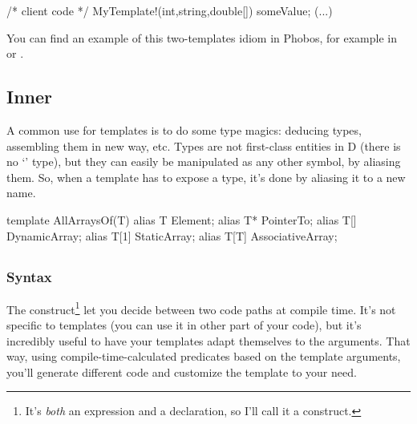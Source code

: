 \begin{dcode}
/* client code */
MyTemplate!(int,string,double[]) someValue;
(...)
\end{dcode}

You can find an example of this two-templates idiom in Phobos, for example in  or .

\subsection{Inner }\label{inneralias}

A common use for templates is to do some type magics: deducing types, assembling them in new way, etc. Types are not first-class entities in D (there is no `' type), but they can easily be manipulated as any other symbol, by aliasing them. So, when a template has to expose a type, it's done by aliasing it to a new name.
\begin{dcode}
template AllArraysOf(T)
{
    alias T    Element;
    alias T*   PointerTo;
    alias T[]  DynamicArray;
    alias T[1] StaticArray;
    alias T[T] AssociativeArray;
}
\end{dcode}


\subsection{}\label{staticif}

\subsubsection{Syntax}

The  construct\footnote{ It's \emph{both} an expression and a declaration, so I'll call it a construct.}
let you decide between two code paths at compile time. It's not specific to templates (you can use it in other part of your code), but it's incredibly useful to have your templates adapt themselves to the arguments. That way, using compile-time-calculated predicates based on the template arguments, you'll generate different code and customize the template to your need.

